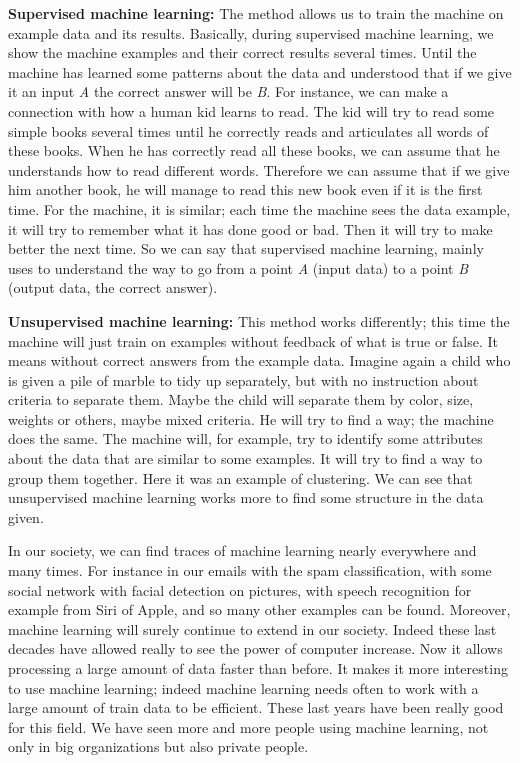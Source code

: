 \documentclass[a4]{article}
\begin{document}
\textbf{Supervised machine learning:} The method allows us to train the machine on example data and its results. Basically, during supervised machine learning, we show the machine examples and their correct results several times. Until the machine has learned some patterns about the data and understood that if we give it an input \textit{A} the correct answer will be \textit{B}. For instance, we can make a connection with how a human kid learns to read. The kid will try to read some simple books several times until he correctly reads and articulates all words of these books. When he has correctly read all these books, we can assume that he understands how to read different words. Therefore we can assume that if we give him another book, he will manage to read this new book even if it is the first time. For the machine, it is similar; each time the machine sees the data example, it will try to remember what it has done good or bad. Then it will try to make better the next time. So we can say that supervised machine learning, mainly uses to understand the way to go from a point \textit{A} (input data) to a point \textit{B} (output data, the correct answer).

\textbf{Unsupervised machine learning:} This method works differently; this time the machine will just train on examples without feedback of what is true or false. It means without correct answers from the example data. Imagine again a child who is given a pile of marble to tidy up separately, but with no instruction about criteria to separate them. Maybe the child will separate them by color, size, weights or others, maybe mixed criteria. He will try to find a way; the machine does the same. The machine will, for example, try to identify some attributes about the data that are similar to some examples. It will try to find a way to group them together. Here it was an example of clustering. We can see that unsupervised machine learning works more to find some structure in the data given.

In our society, we can find traces of machine learning nearly everywhere and many times. For instance in our emails with the spam classification, with some social network with facial detection on pictures, with speech recognition for example from Siri of Apple, and so many other examples can be found. Moreover, machine learning will surely continue to extend in our society. Indeed these last decades have allowed really to see the power of computer increase. Now it allows processing a large amount of data faster than before. It makes it more interesting to use machine learning; indeed machine learning needs often to work with a large amount of train data to be efficient. These last years have been really good for this field. We have seen more and more people using machine learning, not only in big organizations but also private people. 
\end{document}
